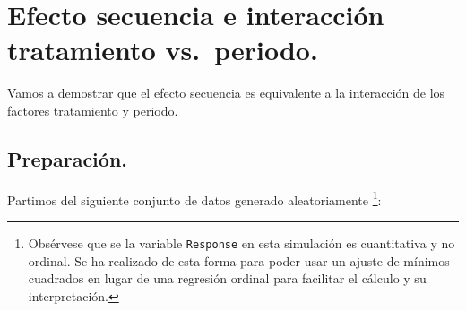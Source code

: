 \documentclass[
  12pt,
  a4paper,
  extrafontsizes,
  onecolumn,
  openright]{memoir}
\newenvironment{Shaded}{\begin{snugshade}}{\end{snugshade}}
\newcommand{\AttributeTok}[1]{\textcolor[rgb]{0.40,0.45,0.13}{#1}}
\newcommand{\ConstantTok}[1]{\textcolor[rgb]{0.56,0.35,0.01}{#1}}
\newcommand{\DecValTok}[1]{\textcolor[rgb]{0.68,0.00,0.00}{#1}}
\newcommand{\FunctionTok}[1]{\textcolor[rgb]{0.28,0.35,0.67}{#1}}
\newcommand{\NormalTok}[1]{\textcolor[rgb]{0.00,0.23,0.31}{#1}}
\newcommand{\OtherTok}[1]{\textcolor[rgb]{0.00,0.23,0.31}{#1}}
\newcommand{\SpecialCharTok}[1]{\textcolor[rgb]{0.37,0.37,0.37}{#1}}
\newcommand{\StringTok}[1]{\textcolor[rgb]{0.13,0.47,0.30}{#1}}
\begin{document}
\printbibliography[heading=none]

\cleardoublepage
{}
{}
\appendix

\hypertarget{sec-contrasts}{%
\chapter{Efecto secuencia e interacción tratamiento
vs.~periodo.}\label{sec-contrasts}}

Vamos a demostrar que el efecto secuencia es equivalente a la
interacción de los factores tratamiento y periodo.

\hypertarget{preparaciuxf3n.}{%
\section{Preparación.}\label{preparaciuxf3n.}}

Partimos del siguiente conjunto de datos generado aleatoriamente
\footnote{Obsérvese que se la variable \texttt{Response} en esta
  simulación es cuantitativa y no ordinal. Se ha realizado de esta forma
  para poder usar un ajuste de mínimos cuadrados en lugar de una
  regresión ordinal para facilitar el cálculo y su interpretación.}:
\scriptsize

\begin{Shaded}
\end{Shaded}
\end{document}
